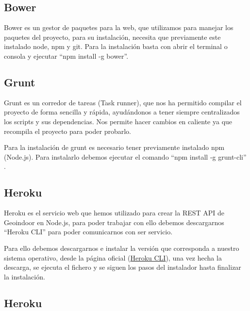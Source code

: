 
\subsection{Bower}

Bower es un gestor de paquetes para la web, que utilizamos para manejar los paquetes del proyecto, para su instalación, necesita que previamente este instalado node, npm y git. Para la instalación basta con abrir el terminal o consola y ejecutar ``npm install -g bower''.\cite{boweranexbib}


\subsection{Grunt}

Grunt es un corredor de tareas (Task runner), que nos ha permitido compilar el proyecto de forma sencilla y rápida, ayudándonos a tener siempre centralizados los scripts y sus dependencias. Nos permite hacer cambios en caliente ya que recompila el proyecto para poder probarlo.

Para la instalación de grunt es necesario tener previamente instalado npm (Node.js). Para instalarlo debemos ejecutar el comando ``npm install -g grunt-cli'' \cite{gruntbibanex}.


\subsection{Heroku}

Heroku es el servicio web que hemos utilizado para crear la REST API de Geoindoor en Node.js, para poder trabajar con ello debemos descargarnos ``Heroku CLI'' para poder comunicarnos con ser servicio.

Para ello debemos descargarnos e instalar la versión que corresponda a nuestro sistema operativo, desde la página oficial (\href{https://devcenter.heroku.com/articles/getting-started-with-nodejs#set-up}{Heroku CLI}), una vez hecha la descarga, se ejecuta el fichero y se siguen los pasos del instalador hasta finalizar la instalación.

\subsection{Heroku}

